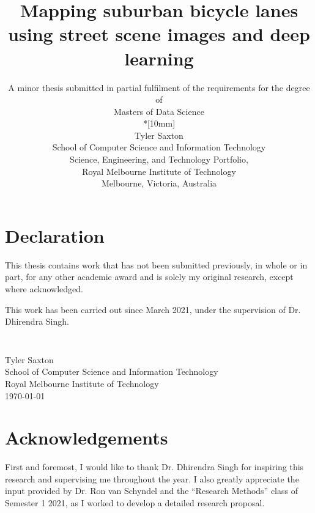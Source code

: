 \documentclass[11pt,twoside]{report}
\newcommand{\SubmissionDate}{\today}
\newcommand{\student}{Tyler Saxton}
\newcommand{\supervisor}{Dr. Dhirendra Singh}
\newcommand{\topic}{Mapping suburban bicycle lanes using street scene images and deep learning}
\newcommand{\school}{School of Computer Science and Information Technology}
\newcommand{\program}{Masters of Data Science}
\newcommand{\institution}{Royal Melbourne Institute of Technology}
\begin{document}
\title{{\Large\bf \topic}}
\author{
A minor thesis submitted in partial fulfilment of the requirements for the degree of
\\\program\\*[10mm]
\\\student
\\\school
\\Science, Engineering, and Technology Portfolio,
\\\institution
\\Melbourne, Victoria, Australia
}
\maketitle
\thispagestyle{empty}


\chapter*{Declaration}

This thesis contains work that has not been submitted previously, in
whole or in part, for any other academic award and is solely my
original research, except where acknowledged.

This work has been carried out since March 2021, under the
supervision of {\supervisor}.

\paragraph{}
\vspace{5cm}\noindent \\\student \\
\school\\
\institution\\
\SubmissionDate



\chapter*{Acknowledgements}

First and foremost, I would like to thank Dr. Dhirendra Singh for inspiring this research and supervising me throughout the year.  I also greatly appreciate the input provided by Dr. Ron van Schyndel and the ``Research Methods'' class of Semester 1 2021, as I worked to develop a detailed research proposal. \\
\end{document}
